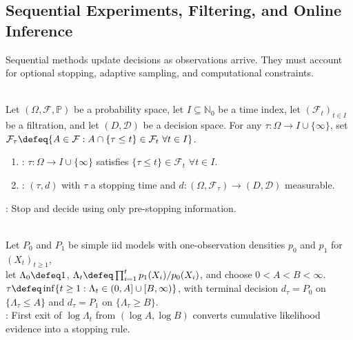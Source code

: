 \subsection{Sequential Experiments, Filtering, and Online Inference}

Sequential methods update decisions as observations arrive.  They must account for optional stopping, adaptive sampling, and computational constraints.

\begin{definition} \label{def:sequential-test-stopping-time} \\
Let $(\Omega,\mathcal{F},\mathbb{P})$ be a probability space, let $I\subseteq\mathbb{N}_0$ be a time index, let $(\mathcal{F}_t)_{t\in I}$ be a filtration, and let $(D,\mathcal{D})$ be a decision space.
For any $\tau:\Omega\to I\cup\{\infty\}$, set $\mathcal{F}_\tau\defeq\{A\in\mathcal{F}:A\cap\{\tau\leq t\}\in\mathcal{F}_t\ \forall t\in I\}$.
\begin{enumerate}[label=(\roman*)]
\setlength{\itemsep}{0pt}
\item {}: $\tau:\Omega\to I\cup\{\infty\}$ satisfies $\{\tau\leq t\}\in\mathcal{F}_t$ $\forall t\in I$.
\item {}: $(\tau,d)$ with $\tau$ a stopping time and $d:(\Omega,\mathcal{F}_\tau)\to(D,\mathcal{D})$ measurable.
\end{enumerate}
: Stop and decide using only pre-stopping information.
\end{definition}

\begin{definition} \label{def:sprt} \\
Let $P_0$ and $P_1$ be simple iid models with one-observation densities $p_0$ and $p_1$ for $(X_t)_{t\geq1}$,\\
let $\Lambda_0\defeq1$, $\Lambda_t\defeq\prod_{i=1}^{t}p_1(X_i)/p_0(X_i)$, and choose $0<A<B<\infty$.\\
$\tau\defeq\inf\{t\geq1:\Lambda_t\in(0,A]\cup[B,\infty)\}$, with terminal decision $d_\tau=P_0$ on $\{\Lambda_\tau\leq A\}$ and $d_\tau=P_1$ on $\{\Lambda_\tau\geq B\}$.\\
: First exit of $\log\Lambda_t$ from $(\log A,\log B)$ converts cumulative likelihood evidence into a stopping rule.
\end{definition}

